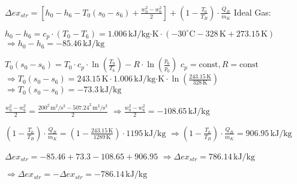 \(\Delta ex_{str} = [h_0 - h_6 - T_0 (s_0 - s_6) + \frac{w_0^2 - w_6^2}{2}] + (1 - \frac{T_0}{T_B}) \cdot \frac{\dot{Q}_B}{\dot{m}_K} \)  
Ideal Gas:  

\( h_0 - h_6 = c_p \cdot (T_0 - T_6) = 1.006 \, \text{kJ/kg·K} \cdot (-30^\circ \text{C} - 328 \, \text{K} + 273.15 \, \text{K}) \)  
\(\Rightarrow h_0 - h_6 = -85.46 \, \text{kJ/kg} \)  

\( T_0 (s_0 - s_6) = T_0 \cdot c_p \cdot \ln \left( \frac{T_0}{T_6} \right) - R \cdot \ln \left( \frac{p_6}{p_0} \right) \)  
\( c_p = \text{const}, R = \text{const} \)  
\(\Rightarrow T_0 (s_0 - s_6) = 243.15 \, \text{K} \cdot 1.006 \, \text{kJ/kg·K} \cdot \ln \left( \frac{243.15 \, \text{K}}{328 \, \text{K}} \right) \)  
\(\Rightarrow T_0 (s_0 - s_6) = -73.3 \, \text{kJ/kg} \)  

\(\frac{w_0^2 - w_6^2}{2} = \frac{200^2 \, \text{m}^2/\text{s}^2 - 507.24^2 \, \text{m}^2/\text{s}^2}{2} \)  
\(\Rightarrow \frac{w_0^2 - w_6^2}{2} = -108.65 \, \text{kJ/kg} \)  

\((1 - \frac{T_0}{T_B}) \cdot \frac{\dot{Q}_B}{\dot{m}_K} = (1 - \frac{243.15 \, \text{K}}{1289 \, \text{K}}) \cdot 1195 \, \text{kJ/kg} \)  
\(\Rightarrow (1 - \frac{T_0}{T_B}) \cdot \frac{\dot{Q}_B}{\dot{m}_K} = 906.95 \, \text{kJ/kg} \)  

\(\Delta ex_{str} = -85.46 + 73.3 - 108.65 + 906.95 \)  
\(\Rightarrow \Delta ex_{str} = 786.14 \, \text{kJ/kg} \)  

\(\Rightarrow \Delta ex_{str} = -\Delta ex_{str} = -786.14 \, \text{kJ/kg} \)
